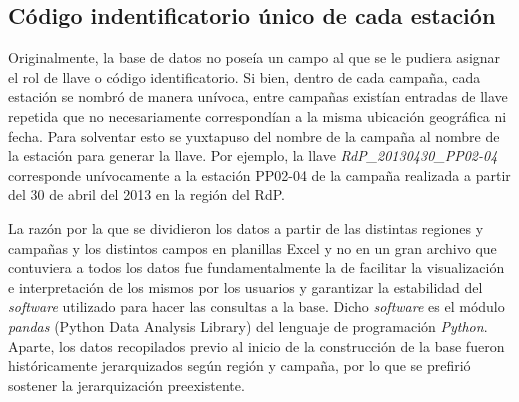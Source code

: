     \subsection{Código indentificatorio único de cada estación}
    \label{dat:s:codigo}
     
        Originalmente, la base de datos no poseía un campo al que se le pudiera asignar el rol de llave o código identificatorio. Si bien, dentro de cada campaña, cada estación se nombró de manera unívoca, entre campañas existían entradas de llave repetida que no necesariamente correspondían a la misma ubicación geográfica ni fecha. Para solventar esto se yuxtapuso del nombre de la campaña al nombre de la estación para generar la llave. Por ejemplo, la llave \textit{RdP\_20130430\_PP02-04} corresponde unívocamente a la estación PP02-04 de la campaña realizada a partir del 30 de abril del 2013 en la región del RdP.
        
        La razón por la que se dividieron los datos a partir de las distintas regiones y campañas y los distintos campos en planillas Excel y no en un gran archivo que contuviera a todos los datos fue fundamentalmente la de facilitar la visualización e interpretación de los mismos por los usuarios y garantizar la estabilidad del \textit{software} utilizado para hacer las consultas a la base. Dicho \textit{software} es el módulo \textit{pandas} (Python Data Analysis Library) del lenguaje de programación \textit{Python}. Aparte, los datos recopilados previo al inicio de la construcción de la base fueron históricamente jerarquizados según región y campaña, por lo que se prefirió sostener la jerarquización preexistente.
    
